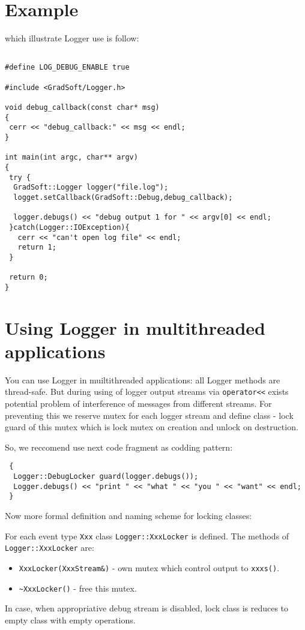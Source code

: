 \documentclass[10pt]{article}
\begin{document}
  
\section{ Example }
  which illustrate Logger use is follow:


\begin{verbatim}

#define LOG_DEBUG_ENABLE true

#include <GradSoft/Logger.h>

void debug_callback(const char* msg)
{
 cerr << "debug_callback:" << msg << endl;
}

int main(int argc, char** argv)
{
 try {
  GradSoft::Logger logger("file.log");
  logget.setCallback(GradSoft::Debug,debug_callback);
 
  logger.debugs() << "debug output 1 for " << argv[0] << endl; 
 }catch(Logger::IOException){
   cerr << "can't open log file" << endl;
   return 1;
 }

 return 0;
}

\end{verbatim}

\section{ Using Logger in multithreaded applications }
 
 You can use Logger in muiltithreaded applications: all Logger methods
are thread-safe. But during using of logger output streams via 
\verb|operator<<| exists potential problem of interference of messages 
from different streams. For preventing this we reserve mutex for each logger
stream and define class - lock guard of this mutex which is lock mutex
on creation and unlock on destruction.

 So, we reccomend use next code fragment as codding pattern:
\begin{verbatim}
 {
  Logger::DebugLocker guard(logger.debugs());
  Logger.debugs() << "print " << "what " << "you " << "want" << endl;
 }
\end{verbatim}

 Now more formal definition and naming scheme for locking classes:
 
 For each event type \verb|Xxx| class \verb|Logger::XxxLocker| is defined.
The methods of \verb|Logger::XxxLocker| are:
\begin{itemize} 
  \item \verb|XxxLocker(XxxStream&)| - own mutex which control output to 
  \verb|xxxs()|.
  \item \verb|~XxxLocker()| - free this mutex. 
\end{itemize} 
 In case, when appropriative debug stream is disabled, lock class is reduces
to empty class with empty operations.
\end{document}
